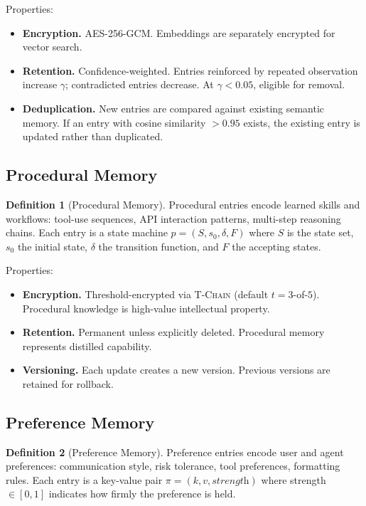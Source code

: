 \documentclass[11pt,letterpaper]{article}
\theoremstyle{definition}
\newtheorem{definition}{Definition}
\theoremstyle{remark}
\newcommand{\TChain}{\textsc{T-Chain}}
\begin{document}
Properties:
\begin{itemize}
    \item \textbf{Encryption.} AES-256-GCM. Embeddings are separately encrypted for vector search.
    \item \textbf{Retention.} Confidence-weighted. Entries reinforced by repeated observation increase $\gamma$; contradicted entries decrease. At $\gamma < 0.05$, eligible for removal.
    \item \textbf{Deduplication.} New entries are compared against existing semantic memory. If an entry with cosine similarity $> 0.95$ exists, the existing entry is updated rather than duplicated.
\end{itemize}

\subsection{Procedural Memory}

\begin{definition}[Procedural Memory]
Procedural entries encode learned skills and workflows: tool-use sequences, API interaction patterns, multi-step reasoning chains. Each entry is a state machine $p = (S, s_0, \delta, F)$ where $S$ is the state set, $s_0$ the initial state, $\delta$ the transition function, and $F$ the accepting states.
\end{definition}

Properties:
\begin{itemize}
    \item \textbf{Encryption.} Threshold-encrypted via \TChain{} (default $t = 3$-of-$5$). Procedural knowledge is high-value intellectual property.
    \item \textbf{Retention.} Permanent unless explicitly deleted. Procedural memory represents distilled capability.
    \item \textbf{Versioning.} Each update creates a new version. Previous versions are retained for rollback.
\end{itemize}

\subsection{Preference Memory}

\begin{definition}[Preference Memory]
Preference entries encode user and agent preferences: communication style, risk tolerance, tool preferences, formatting rules. Each entry is a key-value pair $\pi = (k, v, \textit{strength})$ where strength $\in [0, 1]$ indicates how firmly the preference is held.
\end{definition}
\end{document}
